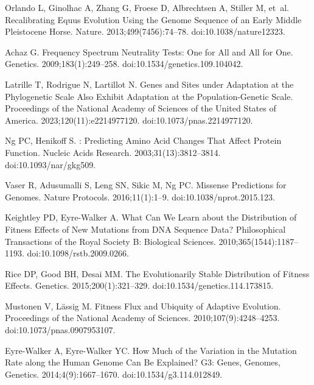 \documentclass[10pt,letterpaper]{article}
\begin{document}
\begin{thebibliography}{10}
Orlando L, Ginolhac A, Zhang G, Froese D, Albrechtsen A, Stiller M, et~al.
\newblock Recalibrating {{Equus}} Evolution Using the Genome Sequence of an
Early {{Middle Pleistocene}} Horse.
\newblock Nature. 2013;499(7456):74--78.
\newblock doi:{10.1038/nature12323}.

Achaz G.
\newblock Frequency {{Spectrum Neutrality Tests}}: {{One}} for {{All}} and
{{All}} for {{One}}.
\newblock Genetics. 2009;183(1):249--258.
\newblock doi:{10.1534/genetics.109.104042}.

Latrille T, Rodrigue N, Lartillot N.
\newblock Genes and Sites under Adaptation at the Phylogenetic Scale Also
Exhibit Adaptation at the Population-Genetic Scale.
\newblock Proceedings of the National Academy of Sciences of the United States
of America. 2023;120(11):e2214977120.
\newblock doi:{10.1073/pnas.2214977120}.

Ng PC, Henikoff S.
: Predicting Amino Acid Changes That Affect Protein Function.
\newblock Nucleic Acids Research. 2003;31(13):3812--3814.
\newblock doi:{10.1093/nar/gkg509}.

Vaser R, Adusumalli S, Leng SN, Sikic M, Ng PC.
 Missense Predictions for Genomes.
\newblock Nature Protocols. 2016;11(1):1--9.
\newblock doi:{10.1038/nprot.2015.123}.

Keightley PD, {Eyre-Walker} A.
\newblock What Can We Learn about the Distribution of Fitness Effects of New
Mutations from {{DNA}} Sequence Data?
\newblock Philosophical Transactions of the Royal Society B: Biological
Sciences. 2010;365(1544):1187--1193.
\newblock doi:{10.1098/rstb.2009.0266}.

Rice DP, Good BH, Desai MM.
\newblock The {{Evolutionarily Stable Distribution}} of {{Fitness Effects}}.
\newblock Genetics. 2015;200(1):321--329.
\newblock doi:{10.1534/genetics.114.173815}.

Mustonen V, L{\"a}ssig M.
\newblock Fitness Flux and Ubiquity of Adaptive Evolution.
\newblock Proceedings of the National Academy of Sciences.
2010;107(9):4248--4253.
\newblock doi:{10.1073/pnas.0907953107}.

{Eyre-Walker} A, {Eyre-Walker} YC.
\newblock How Much of the Variation in the Mutation Rate along the Human Genome
Can Be Explained?
\newblock G3: Genes, Genomes, Genetics. 2014;4(9):1667--1670.
\newblock doi:{10.1534/g3.114.012849}.


\end{thebibliography}
\end{document}
